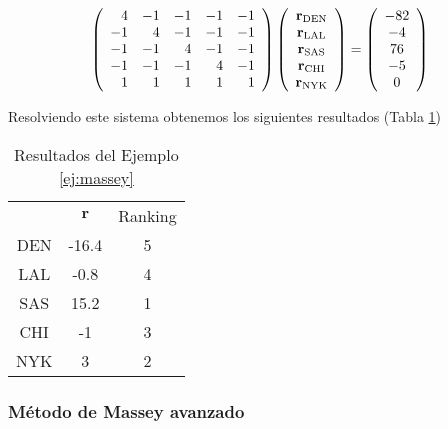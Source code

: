 \begin{ejemplo}
\begin{equation*}
\left(\begin{array}{r r r r r}
4  & -1 & -1 & -1 & -1\\
-1 &  4 & -1 & -1 & -1\\
-1 & -1 &  4 & -1 & -1\\
-1 & -1 & -1 &  4 & -1\\
 1 &  1 &  1 &  1 &  1 
\end{array}\right)
\left(\begin{array}{c}
\mathbf{r}_{\text{DEN}}\\
\mathbf{r}_{\text{LAL}}\\
\mathbf{r}_{\text{SAS}}\\
\mathbf{r}_{\text{CHI}}\\
\mathbf{r}_{\text{NYK}}
\end{array}\right)
=
\left(\begin{array}{c}
-82\\
-4\\
76\\
-5\\
0
\end{array}\right)
\end{equation*}

Resolviendo este sistema obtenemos los siguientes resultados (Tabla \ref{tbl:massey_resultados})

\begin{table}[h]
\centering
\caption{Resultados del Ejemplo \ref{ej:massey}}
\label{tbl:massey_resultados}
\begin{tabular}{@{}ccc@{}}
\cmidrule(l){2-3}
    & $\mathbf{r}$ & Ranking \\ \cmidrule(l){2-3} 
DEN & -16.4          & 5       \\ \midrule
LAL & -0.8       & 4       \\ \midrule
SAS & 15.2         & 1       \\ \midrule
CHI & -1        & 3       \\ \midrule
NYK & 3         & 2       \\ \bottomrule
\end{tabular}
\end{table}
\end{ejemplo}
\subsubsection{Método de Massey avanzado}

